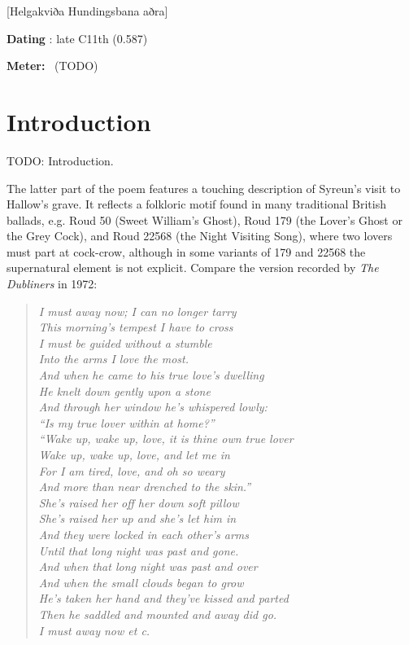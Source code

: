 [Helgakviða Hundingsbana aðra]
\def\thisBookCode{HelgakvidaTwo}

\begin{flushright}%
\textbf{Dating} \parencite{Sapp2022}: late C11th (0.587)

\textbf{Meter:} \Fornyrdislag\ (TODO)%
\end{flushright}

\section{Introduction}

TODO: Introduction.

The latter part of the poem features a touching description of Syreun’s visit to Hallow’s grave.  It reflects a folkloric motif found in many traditional British ballads, e.g. Roud 50 (Sweet William’s Ghost), Roud 179 (the Lover’s Ghost or the Grey Cock), and Roud 22568 (the Night Visiting Song), where two lovers must part at cock-crow, although in some variants of 179 and 22568 the supernatural element is not explicit.  Compare the version recorded by \emph{The Dubliners} in 1972:

\begin{quote}\itshape I must away now; I can no longer tarry \\
This morning’s tempest I have to cross \\
I must be guided without a stumble \\
Into the arms I love the most. \\

And when he came to his true love’s dwelling \\
He knelt down gently upon a stone \\
And through her window he’s whispered lowly: \\
“Is my true lover within at home?” \\

“Wake up, wake up, love, it is thine own true lover \\
Wake up, wake up, love, and let me in \\
For I am tired, love, and oh so weary \\
And more than near drenched to the skin.” \\

She’s raised her off her down soft pillow \\
She’s raised her up and she’s let him in \\
And they were locked in each other’s arms \\
Until that long night was past and gone. \\

And when that long night was past and over \\
And when the small clouds began to grow \\
He’s taken her hand and they’ve kissed and parted \\
Then he saddled and mounted and away did go. \\

I must away now \emph{et c.}\end{quote}

